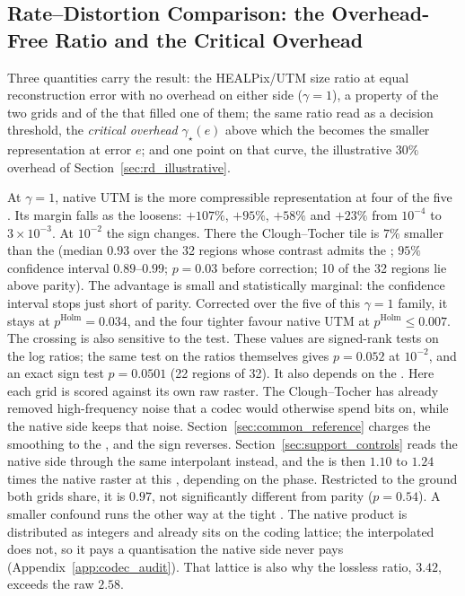 \subsection{Rate--Distortion Comparison: the Overhead-Free Ratio and the Critical Overhead}
\label{sec:rd_main}

Three quantities carry the result: the HEALPix/UTM size ratio at equal
reconstruction error with no overhead on either side ($\gamma=1$), a
property of the two grids and of the  that filled one of
them; the same ratio read as a decision threshold, the \emph{critical
overhead} $\gamma_\star(e)$ above which the  becomes the
smaller representation at error $e$; and one point on that curve, the
illustrative $30\%$ overhead of Section~\ref{sec:rd_illustrative}.

At $\gamma=1$, native UTM is the more compressible representation at four
of the five . Its margin falls as the  loosens:
$+107\%$, $+95\%$, $+58\%$ and $+23\%$ from $10^{-4}$ to
$3\times10^{-3}$. At $10^{-2}$ the sign changes. There the Clough--Tocher
tile is $7\%$ smaller than the  (median $0.93$ over the 32
regions whose contrast admits the ; $95\%$ confidence interval
$0.89$--$0.99$; $p=0.03$ before correction; 10 of the 32 regions lie
above parity). The advantage is small and statistically marginal: the
confidence interval stops just short of parity. Corrected over the five
 of this $\gamma=1$ family, it stays at
$p^{\mathrm{Holm}}=0.034$, and the four tighter  favour
native UTM at $p^{\mathrm{Holm}}\le0.007$. The crossing is also
sensitive to the test. These values are signed-rank tests on the log
ratios; the same test on the ratios themselves gives $p=0.052$ at
$10^{-2}$, and an exact sign test $p=0.0501$ (22 regions of 32). It also depends on the
. Here each grid is scored against its own raw raster. The
Clough--Tocher  has already removed high-frequency noise that a
codec would otherwise spend bits on, while the native side keeps that
noise. Section~\ref{sec:common_reference} charges the smoothing to the
, and the sign reverses. Section~\ref{sec:support_controls} reads
the native side through the same interpolant instead, and the  is then
$1.10$ to $1.24$ times the native raster at this , depending on the phase.
Restricted to the ground both grids share, it is $0.97$, not significantly
different from parity ($p=0.54$). A smaller confound runs
the other way at the tight . The native product is distributed
as integers and already sits on the coding lattice; the interpolated
 does not, so it pays a quantisation the native side never pays
(Appendix~\ref{app:codec_audit}). That lattice is also why the lossless
ratio, $3.42$, exceeds the raw $2.58$.

